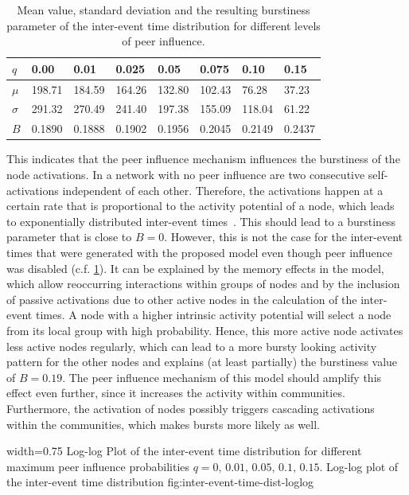 \begin{table}
\centering
\begin{tabular}{llllllll}
\( q \) & 0.00 & 0.01 & 0.025 & 0.05 & 0.075 & 0.10 & 0.15 \\
\midrule
\( \mu \) & 198.71 & 184.59 & 164.26 & 132.80 & 102.43 & 76.28 & 37.23 \\
\midrule
\( \sigma \) & 291.32 & 270.49 & 241.40 & 197.38 & 155.09 & 118.04 & 61.22 \\
\midrule
\( B \) & 0.1890 & 0.1888 & 0.1902 & 0.1956 & 0.2045 & 0.2149 & 0.2437
\end{tabular}

\caption[Burstiness of inter-event time distributions]{Mean value, standard deviation and the resulting burstiness parameter of the inter-event time distribution for different levels of peer influence.}
\label{tbl:burstiness-parameter}
\end{table}


This indicates that the peer influence mechanism influences the burstiness of the node activations.
In a network with no peer influence are two consecutive self-activations independent of each other.
Therefore, the activations happen at a certain rate that is proportional to the activity potential of a node, which leads to exponentially distributed inter-event times~\cite{Moinet2016}.
This should lead to a burstiness parameter that is close to \( B = 0 \).
However, this is not the case for the inter-event times that were generated with the proposed model even though peer influence was disabled (c.f. \cref{tbl:burstiness-parameter}).
It can be explained by the memory effects in the model, which allow reoccurring interactions within groups of nodes and by the inclusion of passive activations due to other active nodes in the calculation of the inter-event times.
A node with a higher intrinsic activity potential will select a node from its local group with high probability.
Hence, this more active node activates less active nodes regularly, which can lead to a more bursty looking activity pattern for the other nodes and explains (at least partially) the burstiness value of \( B = 0.19 \).
The peer influence mechanism of this model should amplify this effect even further, since it increases the activity within communities.
Furthermore, the activation of nodes possibly triggers cascading activations within the communities, which makes bursts more likely as well.


      {width=0.75\textwidth}
      {Log-log Plot of the inter-event time distribution for different maximum peer influence probabilities \( q = 0, \, 0.01, \, 0.05, \, 0.1, \, 0.15\).}
      {Log-log plot of the inter-event time distribution}
      {fig:inter-event-time-dist-loglog}


